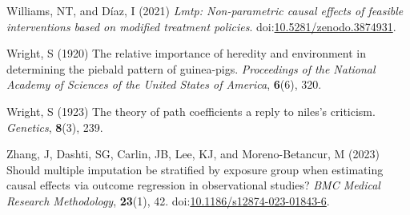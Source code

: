 \documentclass[
  singlecolumn]{article}
\newlength{\cslhangindent}
\newenvironment{CSLReferences}[2] %
 {\begin{list}{}{%
  \setlength{\itemindent}{0pt}
  \setlength{\leftmargin}{0pt}
  \setlength{\parsep}{0pt}
  \ifodd #1
   \setlength{\leftmargin}{\cslhangindent}
   \setlength{\itemindent}{-1\cslhangindent}
  \fi
  \setlength{\itemsep}{#2\baselineskip}}}
 {\end{list}}
\begin{document}
\begin{CSLReferences}{1}{0}
Williams, NT, and Díaz, I (2021) \emph{Lmtp: Non-parametric causal
effects of feasible interventions based on modified treatment policies}.
doi:\href{https://doi.org/10.5281/zenodo.3874931}{10.5281/zenodo.3874931}.

Wright, S (1920) The relative importance of heredity and environment in
determining the piebald pattern of guinea-pigs. \emph{Proceedings of the
National Academy of Sciences of the United States of America},
\textbf{6}(6), 320.

Wright, S (1923) The theory of path coefficients a reply to niles's
criticism. \emph{Genetics}, \textbf{8}(3), 239.

Zhang, J, Dashti, SG, Carlin, JB, Lee, KJ, and Moreno-Betancur, M (2023)
Should multiple imputation be stratified by exposure group when
estimating causal effects via outcome regression in observational
studies? \emph{BMC Medical Research Methodology}, \textbf{23}(1), 42.
doi:\href{https://doi.org/10.1186/s12874-023-01843-6}{10.1186/s12874-023-01843-6}.

\end{CSLReferences}
\end{document}
